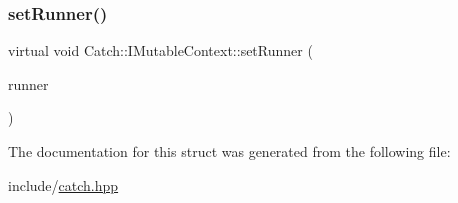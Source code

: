 \mbox{\label{struct_catch_1_1_i_mutable_context_af2e53b1dea4527a2587cff266a730f6e}} 
\subsubsection{\texorpdfstring{set\+Runner()}{setRunner()}}
{\footnotesize\ttfamily virtual void Catch\+::\+I\+Mutable\+Context\+::set\+Runner (\begin{DoxyParamCaption}\item[{\mbox{\hyperlink{struct_catch_1_1_i_runner}{I\+Runner}} $\ast$}]{runner }\end{DoxyParamCaption})\hspace{0.3cm}{\ttfamily [pure virtual]}}



The documentation for this struct was generated from the following file\+:\begin{DoxyCompactItemize}
\item 
include/\mbox{\hyperlink{catch_8hpp}{catch.\+hpp}}\end{DoxyCompactItemize}
